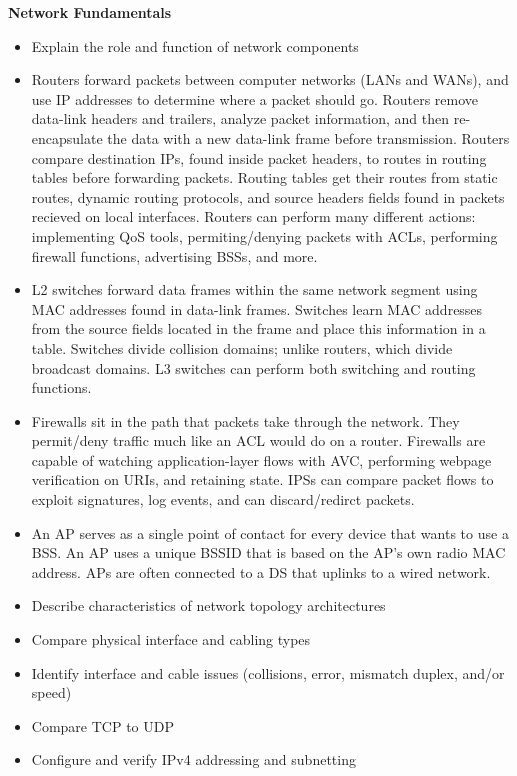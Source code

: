 \documentclass{article}
\begin{document}
\begin{flushleft}\textbf{Network Fundamentals}\end{flushleft}
\begin{itemize}
  \item Explain the role and function of network components
  	\item[] Routers forward packets between computer networks (LANs and WANs), and use IP addresses to determine where a packet should go. Routers remove data-link headers and trailers, analyze packet information, and then re-encapsulate the data with a new data-link frame before transmission. Routers compare destination IPs, found inside packet headers, to routes in routing tables before forwarding packets. Routing tables get their routes from static routes, dynamic routing protocols, and source headers fields found in packets recieved on local interfaces. Routers can perform many different actions: implementing QoS tools, permiting/denying packets with ACLs, performing firewall functions, advertising BSSs, and more. 
	\item[] L2 switches forward data frames within the same network segment using MAC addresses found in data-link frames. Switches learn MAC addresses from the source fields located in the frame and place this information in a table. Switches divide collision domains; unlike routers, which divide broadcast domains. L3 switches can perform both switching and routing functions.
	\item[] Firewalls sit in the path that packets take through the network. They permit/deny traffic much like an ACL would do on a router. Firewalls are capable of watching application-layer flows with AVC, performing webpage verification on URIs, and retaining state. IPSs can compare packet flows to exploit signatures, log events, and can discard/redirct packets.
	\item[] An AP serves as a single point of contact for every device that wants to use a BSS. An AP uses a unique BSSID that is based on the AP's own radio MAC address. APs are often connected to a DS that uplinks to a wired network.
  \item Describe characteristics of network topology architectures
  \item Compare physical interface and cabling types
  \item Identify interface and cable issues (collisions, error, mismatch duplex, and/or speed)
  \item Compare TCP to UDP
  \item Configure and verify IPv4 addressing and subnetting

\end{itemize}
\end{document}
